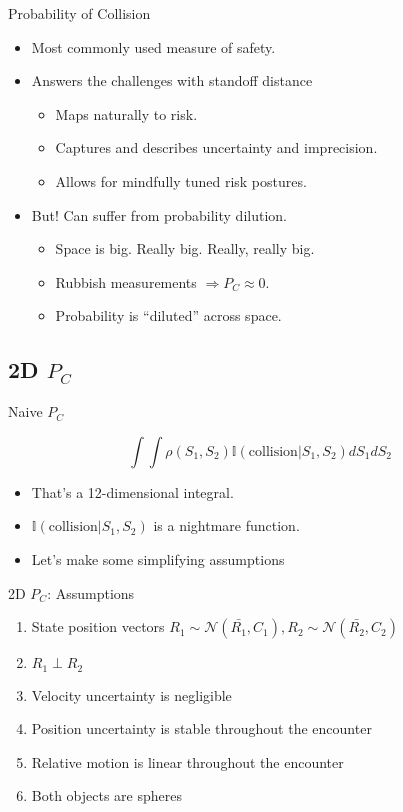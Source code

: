 \documentclass[pdf]{beamer}
\begin{document}
\begin{frame}{Probability of Collision}
  \begin{itemize}
  \item Most commonly used measure of safety.

  \item Answers the challenges with standoff distance
    \begin{itemize}
    \item Maps naturally to risk.
    \item Captures and describes uncertainty and imprecision.
    \item Allows for mindfully tuned risk postures.
    \end{itemize}

  \item But! Can suffer from probability dilution.
    \begin{itemize}
    \item Space is big. Really big. Really, really big.
    \item Rubbish measurements $\Rightarrow P_C \approx 0$.
    \item Probability is ``diluted'' across space.
    \end{itemize}
  \end{itemize}
\end{frame}

\subsection{2D $P_C$}
\begin{frame}{Naive $P_C$}

  \[ \int\int \rho(S_1,S_2) \mathbb{I}(\text{collision} | S_1,S_2) dS_1 dS_2 \]

  \begin{itemize}
  \item That's a 12-dimensional integral.
  \item $\mathbb{I}(\text{collision} | S_1,S_2)$ is a nightmare function.
  \item Let's make some simplifying assumptions
  \end{itemize}
\end{frame}

\begin{frame}{2D $P_C$: Assumptions}
  \begin{enumerate}
  \item State position vectors $R_1 \sim \mathcal{N}(\bar{R_1}, C_1), R_2 \sim \mathcal{N}(\bar{R_2}, C_2)$
  \item $R_1 \perp R_2$
  \item Velocity uncertainty is negligible
  \item Position uncertainty is stable throughout the encounter
  \item Relative motion is linear throughout the encounter
  \item Both objects are spheres
  \end{enumerate}
\end{frame}
\end{document}

